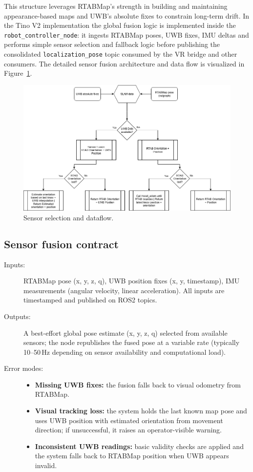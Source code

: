 This structure leverages RTABMap's strength in building and maintaining appearance-based maps and UWB's absolute fixes to constrain long-term drift. In the Tino V2 implementation the global fusion logic is implemented inside the \texttt{robot\_controller\_node}: it ingests RTABMap poses, UWB fixes, IMU deltas and performs simple sensor selection and fallback logic before publishing the consolidated \texttt{localization\_pose} topic consumed by the VR bridge and other consumers. The detailed sensor fusion architecture and data flow is visualized in Figure~\ref{fig-sensor-fusion}.

\begin{figure}[H]
	\centering
	\includegraphics[width=0.85\linewidth]{Images/sensor_fusion.png}
	\caption{Sensor selection and dataflow.}\label{fig-sensor-fusion}
\end{figure}

\subsection*{Sensor fusion contract}
\begin{description}
	\item[Inputs:] RTABMap pose (x, y, z, q), UWB position fixes (x, y, timestamp), IMU measurements (angular velocity, linear acceleration). All inputs are timestamped and published on ROS2 topics.
	\item[Outputs:] A best-effort global pose estimate (x, y, z, q) selected from available sensors; the node republishes the fused pose at a variable rate (typically 10--50\,Hz depending on sensor availability and computational load).
	\item[Error modes:] \begin{itemize}[nosep,leftmargin=*]
		\item \textbf{Missing UWB fixes:} the fusion falls back to visual odometry from RTABMap.
		\item \textbf{Visual tracking loss:} the system holds the last known map pose and uses UWB position with estimated orientation from movement direction; if unsuccessful, it raises an operator-visible warning.
		\item \textbf{Inconsistent UWB readings:} basic validity checks are applied and the system falls back to RTABMap position when UWB appears invalid.
	\end{itemize}
\end{description}

